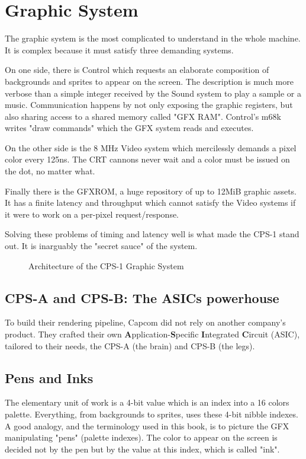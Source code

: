 \section{Graphic System}

The graphic system is the most complicated to understand in the whole machine. It is complex because it must satisfy three demanding systems.



On one side, there is Control which requests an elaborate composition of backgrounds and sprites to appear on the screen. The description is much more verbose than a simple integer received by the Sound system to play a sample or a music. Communication happens by not only exposing the graphic registers, but also sharing access to a shared memory called "GFX RAM". Control's m68k writes "draw commands" which the GFX system reads and executes.

On the other side is the 8 MHz Video system which mercilessly demands a pixel color every 125ns. The CRT cannons never wait and a color must be issued on the dot, no matter what. 

Finally there is the GFXROM, a huge repository of up to 12MiB graphic assets. It has a finite latency and throughput which cannot satisfy the Video systems if it were to work on a per-pixel request/response.

Solving these problems of timing and latency well is what made the CPS-1 stand out. It is inarguably the "secret sauce" of the system. 

\begin{figure}[H]
\caption*{Architecture of the CPS-1 Graphic System}
\end{figure}


\subsection{CPS-A and CPS-B: The ASICs powerhouse}
To build their rendering pipeline, Capcom did not rely on another company's product. They crafted their own \textbf{A}pplication-\textbf{S}pecific \textbf{I}ntegrated \textbf{C}ircuit (ASIC), tailored to their needs, the CPS-A (the brain) and CPS-B (the legs).





\subsection{Pens and Inks}
The elementary unit of work is a 4-bit value which is an index into a 16 colors palette. Everything, from backgrounds to sprites, uses these 4-bit nibble indexes. A good analogy, and the terminology used in this book, is to picture the GFX manipulating "pens" (palette indexes). The color to appear on the screen is decided not by the pen but by the value at this index, which is called "ink".

